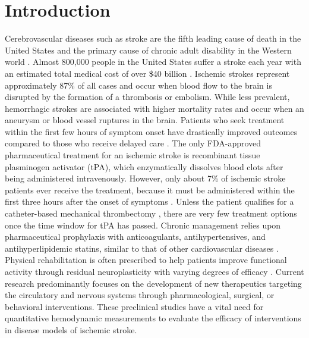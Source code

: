 
\chapter{Introduction} \label{ch:introduction}

Cerebrovascular diseases such as stroke are the fifth leading cause of death in the United States and the primary cause of chronic adult disability in the Western world \cite{Kochanek:ut}. Almost 800,000 people in the United States suffer a stroke each year with an estimated total medical cost of over \$40 billion \cite{Benjamin:2018gy}. Ischemic strokes represent approximately 87\% of all cases and occur when blood flow to the brain is disrupted by the formation of a thrombosis or embolism. While less prevalent, hemorrhagic strokes are associated with higher mortality rates \cite{Andersen:2009ih} and occur when an aneurysm or blood vessel ruptures in the brain. Patients who seek treatment within the first few hours of symptom onset have drastically improved outcomes compared to those who receive delayed care \cite{Hacke:2004kf}. The only FDA-approved pharmaceutical treatment for an ischemic stroke is recombinant tissue plasminogen activator (tPA), which enzymatically dissolves blood clots after being administered intravenously. However, only about 7\% of ischemic stroke patients ever receive the treatment, because it must be administered within the first three hours after the onset of symptoms \cite{Schwamm:2013bs}. Unless the patient qualifies for a catheter-based mechanical thrombectomy \cite{Smith:2008dd}, there are very few treatment options once the time window for tPA has passed. Chronic management relies upon pharmaceutical prophylaxis with anticoagulants, antihypertensives, and antihyperlipidemic statins, similar to that of other cardiovascular diseases \cite{StrokePreventioninAtrialFibrillationInvestigators:1991fl, TheStrokeCouncil:2004bi, Endres:2005bg}. Physical rehabilitation is often prescribed to help patients improve functional activity through residual neuroplasticity with varying degrees of efficacy \cite{Jette:2005ii, French:2010ka, Takeuchi:2013ce, French:2016hk}. Current research predominantly focuses on the development of new therapeutics targeting the circulatory and nervous systems through pharmacological, surgical, or behavioral interventions. These preclinical studies have a vital need for quantitative hemodynamic measurements to evaluate the efficacy of interventions in disease models of ischemic stroke.


